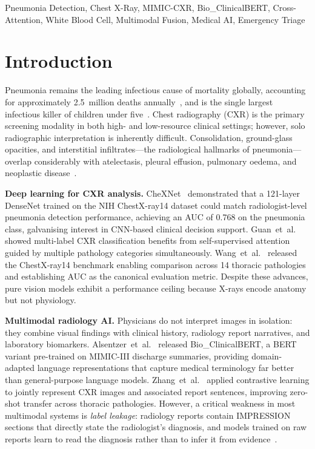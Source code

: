 \documentclass[conference]{IEEEtran}
\begin{document}
\begin{IEEEkeywords}
Pneumonia Detection, Chest X-Ray, MIMIC-CXR, Bio\_ClinicalBERT, Cross-Attention, White Blood Cell, Multimodal Fusion, Medical AI, Emergency Triage
\end{IEEEkeywords}

\section{\textcolor{aideep}{Introduction}}

Pneumonia remains the leading infectious cause of mortality globally, accounting for approximately 2.5~million deaths annually~\cite{gbd2019}, and is the single largest infectious killer of children under five~\cite{who2023}. Chest radiography (CXR) is the primary screening modality in both high- and low-resource clinical settings; however, solo radiographic interpretation is inherently difficult. Consolidation, ground-glass opacities, and interstitial infiltrates---the radiological hallmarks of pneumonia---overlap considerably with atelectasis, pleural effusion, pulmonary oedema, and neoplastic disease~\cite{kelly2012}.

\textbf{Deep learning for CXR analysis.} CheXNet~\cite{rajpurkar2017chexnet} demonstrated that a 121-layer DenseNet trained on the NIH ChestX-ray14 dataset could match radiologist-level pneumonia detection performance, achieving an AUC of 0.768 on the pneumonia class, galvanising interest in CNN-based clinical decision support. Guan~et~al.~\cite{guan2018multi} showed multi-label CXR classification benefits from self-supervised attention guided by multiple pathology categories simultaneously. Wang~et~al.~\cite{wang2017chestxray14} released the ChestX-ray14 benchmark enabling comparison across 14 thoracic pathologies and establishing AUC as the canonical evaluation metric. Despite these advances, pure vision models exhibit a performance ceiling because X-rays encode anatomy but not physiology.

\textbf{Multimodal radiology AI.} Physicians do not interpret images in isolation: they combine visual findings with clinical history, radiology report narratives, and laboratory biomarkers. Alsentzer~et~al.~\cite{alsentzer2019bert} released Bio\_ClinicalBERT, a BERT variant pre-trained on MIMIC-III discharge summaries, providing domain-adapted language representations that capture medical terminology far better than general-purpose language models. Zhang~et~al.~\cite{zhang2020contrastive} applied contrastive learning to jointly represent CXR images and associated report sentences, improving zero-shot transfer across thoracic pathologies. However, a critical weakness in most multimodal systems is \emph{label leakage}: radiology reports contain IMPRESSION sections that directly state the radiologist's diagnosis, and models trained on raw reports learn to read the diagnosis rather than to infer it from evidence~\cite{bannur2023knowledge}.
\end{document}
